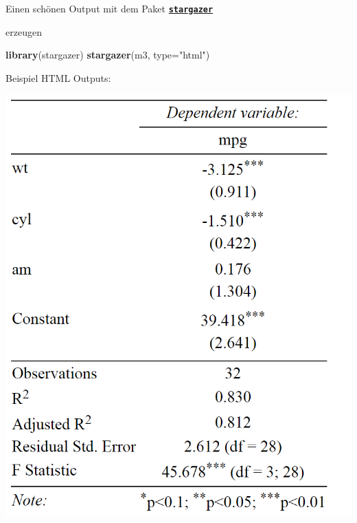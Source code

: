 \documentclass[ignorenonframetext,]{beamer}
\newenvironment{Shaded}{\begin{snugshade}}{\end{snugshade}}
\newcommand{\DataTypeTok}[1]{\textcolor[rgb]{0.13,0.29,0.53}{#1}}
\newcommand{\KeywordTok}[1]{\textcolor[rgb]{0.13,0.29,0.53}{\textbf{#1}}}
\newcommand{\NormalTok}[1]{#1}
\newcommand{\StringTok}[1]{\textcolor[rgb]{0.31,0.60,0.02}{#1}}
\begin{document}
\begin{frame}[fragile]{Einen schönen Output mit dem Paket
\href{https://cran.r-project.org/web/packages/stargazer/vignettes/stargazer.pdf}{\textbf{\texttt{stargazer}}}}
\protect\hypertarget{einen-schonen-output-mit-dem-paket-stargazer}{}

erzeugen

\begin{Shaded}
\begin{Highlighting}[]
\KeywordTok{library}\NormalTok{(stargazer)}
\KeywordTok{stargazer}\NormalTok{(m3, }\DataTypeTok{type=}\StringTok{"html"}\NormalTok{)}
\end{Highlighting}
\end{Shaded}

\begin{block}{Beispiel HTML Outputs:}

\includegraphics{figure/stargazertabex.PNG}

\end{block}

\end{frame}
\end{document}
